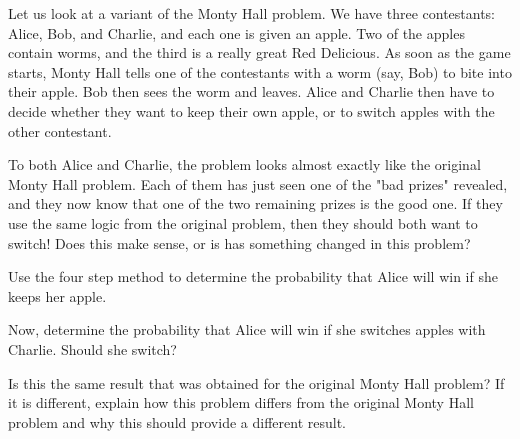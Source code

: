 \begin{problem}
\begin{staffnotes}
\end{staffnotes}

Let us look at a variant of the Monty Hall problem.  We have three
contestants: Alice, Bob, and Charlie, and each one is given an apple.
Two of the apples contain worms, and the third is a really great Red
Delicious.  As soon as the game starts, Monty Hall tells one of the
contestants with a worm (say, Bob) to bite into their apple.  Bob then
sees the worm and leaves.  Alice and Charlie then have to decide
whether they want to keep their own apple, or to switch apples with
the other contestant.

To both Alice and Charlie, the problem looks almost exactly like the
original Monty Hall problem.  Each of them has just seen one of the
"bad prizes" revealed, and they now know that one of the two remaining
prizes is the good one.  If they use the same logic from the original
problem, then they should both want to switch!  Does this make sense,
or is has something changed in this problem?

\bparts

\ppart Use the four step method to determine the probability that
Alice will win if she keeps her apple.

\begin{solution}
\end{solution}

\ppart Now, determine the probability that Alice will win if she
switches apples with Charlie.  Should she switch?

\begin{solution}
\end{solution}

\ppart Is this the same result that was obtained for the original
Monty Hall problem?  If it is different, explain how this problem
differs from the original Monty Hall problem and why this should
provide a different result.

\begin{solution}
\end{solution}

\eparts

\end{problem}

